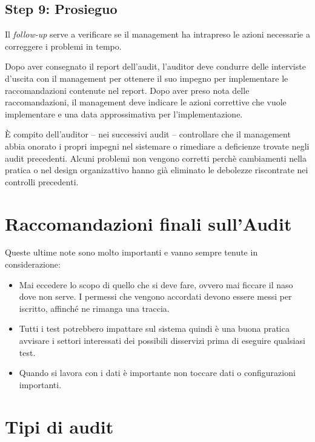 \subsection{Step 9: Prosieguo}


Il \textit{follow-up} serve a verificare se il management ha intrapreso le azioni
necessarie a correggere i problemi in tempo.

Dopo aver consegnato il report dell'audit, l'auditor deve condurre
delle interviste d'uscita con il management per ottenere il suo
impegno per implementare le raccomandazioni contenute nel report.
Dopo aver preso nota delle raccomandazioni, il management deve
indicare le azioni correttive che vuole implementare e una data
approssimativa per l'implementazione.

È compito dell'auditor -- nei successivi audit --
controllare che il management abbia onorato
i propri impegni nel sistemare o rimediare a deficienze trovate negli
audit precedenti.
Alcuni problemi non vengono corretti perchè cambiamenti nella pratica o
nel design organizattivo hanno già eliminato le debolezze riscontrate nei
controlli precedenti.

\section{Raccomandazioni finali sull'Audit}

Queste ultime note sono molto importanti e vanno sempre tenute in
considerazione:
\begin{itemize}
\item Mai eccedere lo scopo di quello che si deve fare, ovvero mai ficcare il
naso dove non serve. I permessi che vengono accordati devono essere messi per
iscritto, affinché ne rimanga una traccia.
\item Tutti i test potrebbero impattare sul sistema quindi è una buona
pratica avvisare i settori interessati dei possibili disservizi prima di eseguire
qualsiasi test.
\item Quando si lavora con i dati è importante non toccare dati o configurazioni
importanti.
\end{itemize}


\section{Tipi di audit}

